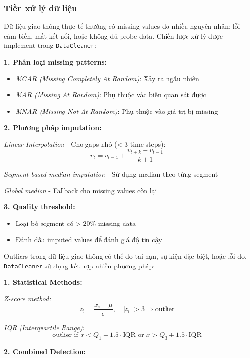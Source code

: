 \subsubsection{Tiền xử lý dữ liệu}


Dữ liệu giao thông thực tế thường có missing values do nhiều nguyên nhân: lỗi cảm biến, mất kết nối, hoặc không đủ probe data. Chiến lược xử lý được implement trong \texttt{DataCleaner}:

\textbf{1. Phân loại missing patterns:}
\begin{itemize}
    \item \textit{MCAR (Missing Completely At Random)}: Xảy ra ngẫu nhiên
    \item \textit{MAR (Missing At Random)}: Phụ thuộc vào biến quan sát được
    \item \textit{MNAR (Missing Not At Random)}: Phụ thuộc vào giá trị bị missing
\end{itemize}

\textbf{2. Phương pháp imputation:}

\textit{Linear Interpolation} - Cho gaps nhỏ (< 3 time steps):
\[
v_t = v_{t-1} + \frac{v_{t+k} - v_{t-1}}{k+1}
\]

\textit{Segment-based median imputation} - Sử dụng median theo từng segment

\textit{Global median} - Fallback cho missing values còn lại

\textbf{3. Quality threshold:}
\begin{itemize}
    \item Loại bỏ segment có > 20\% missing data
    \item Đánh dấu imputed values để đánh giá độ tin cậy
\end{itemize}


Outliers trong dữ liệu giao thông có thể do tai nạn, sự kiện đặc biệt, hoặc lỗi đo. \texttt{DataCleaner} sử dụng kết hợp nhiều phương pháp:

\textbf{1. Statistical Methods:}

\textit{Z-score method:}
\[
z_i = \frac{x_i - \mu}{\sigma}, \quad |z_i| > 3 \Rightarrow \text{outlier}
\]

\textit{IQR (Interquartile Range):}
\[
\text{outlier if } x < Q_1 - 1.5 \cdot \text{IQR} \text{ or } x > Q_3 + 1.5 \cdot \text{IQR}
\]

\textbf{2. Combined Detection:}

